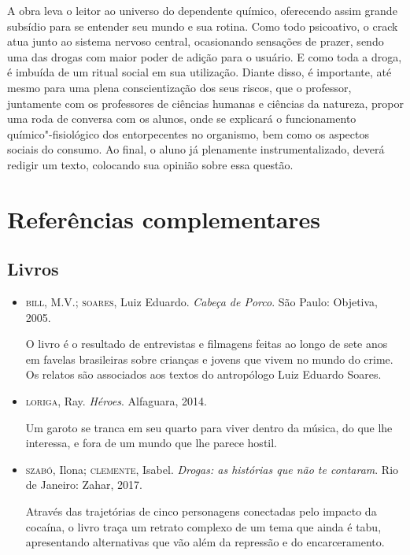 \documentclass[12pt]{extarticle}
\begin{document}
A obra leva o leitor ao universo do dependente químico, oferecendo
assim grande subsídio para se entender seu mundo e sua rotina. Como
todo psicoativo, o crack atua junto ao sistema nervoso central,
ocasionando sensações de prazer, sendo uma das drogas com maior poder
de adição para o usuário. E como toda a droga, é imbuída de um ritual
social em sua utilização. Diante disso, é importante, até mesmo para
uma plena conscientização dos seus riscos, que o professor, juntamente
com os professores de ciências humanas e ciências da natureza, propor
uma roda de conversa com os alunos, onde se explicará o funcionamento
químico"-fisiológico dos entorpecentes no organismo, bem como os
aspectos sociais do consumo. Ao final, o aluno já plenamente
instrumentalizado, deverá redigir um texto, colocando sua opinião
sobre essa questão.

\section{Referências complementares}

\subsection{Livros}

\begin{itemize}
\item\textsc{bill}, M.V.; \textsc{soares}, Luiz Eduardo. \textit{Cabeça de Porco}. São Paulo: Objetiva, 2005.

O livro é o resultado de entrevistas e filmagens feitas ao longo de sete
anos em favelas brasileiras sobre crianças e jovens que vivem no mundo
do crime. Os relatos são associados aos textos do antropólogo Luiz
Eduardo Soares.

\item\textsc{loriga}, Ray. \textit{Héroes}. Alfaguara, 2014.

Um garoto se tranca em seu quarto para viver dentro da música, do que
lhe interessa, e fora de um mundo que lhe parece hostil.

\item\textsc{szabó}, Ilona; \textsc{clemente}, Isabel. \textit{Drogas: as histórias que não te contaram}. Rio de Janeiro: Zahar, 2017.

Através das trajetórias de cinco personagens conectadas pelo impacto da
cocaína, o livro traça um retrato complexo de um tema que ainda é tabu,
apresentando alternativas que vão além da repressão e do encarceramento.
\end{itemize}
\end{document}
